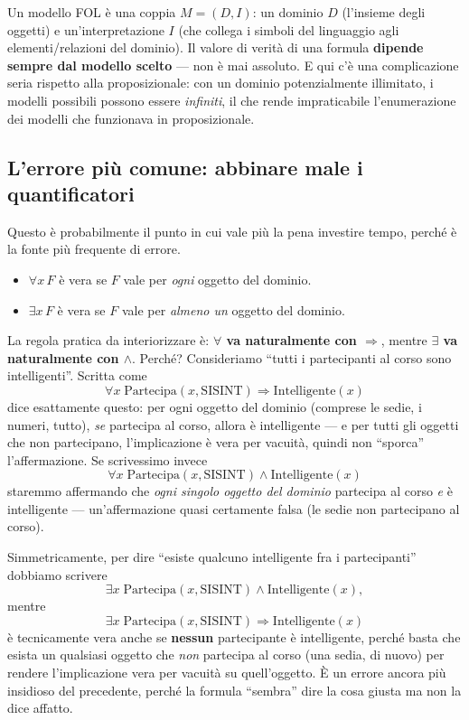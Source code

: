 \documentclass[11pt,a4paper]{article}
\begin{document}
Un modello FOL è una coppia $M=(D,I)$: un dominio $D$ (l'insieme degli oggetti) e un'interpretazione $I$ (che collega i simboli del linguaggio agli elementi/relazioni del dominio). Il valore di verità di una formula \textbf{dipende sempre dal modello scelto} --- non è mai assoluto. E qui c'è una complicazione seria rispetto alla proposizionale: con un dominio potenzialmente illimitato, i modelli possibili possono essere \emph{infiniti}, il che rende impraticabile l'enumerazione dei modelli che funzionava in proposizionale.

\subsection{L'errore più comune: abbinare male i quantificatori}

Questo è probabilmente il punto in cui vale più la pena investire tempo, perché è la fonte più frequente di errore.

\begin{itemize}
  \item $\forall x\, F$ è vera se $F$ vale per \emph{ogni} oggetto del dominio.
  \item $\exists x\, F$ è vera se $F$ vale per \emph{almeno un} oggetto del dominio.
\end{itemize}

La regola pratica da interiorizzare è: \textbf{$\forall$ va naturalmente con $\Rightarrow$}, mentre \textbf{$\exists$ va naturalmente con $\wedge$}. Perché? Consideriamo ``tutti i partecipanti al corso sono intelligenti''. Scritta come
\[
\forall x\; \text{Partecipa}(x,\text{SISINT}) \Rightarrow \text{Intelligente}(x)
\]
dice esattamente questo: per ogni oggetto del dominio (comprese le sedie, i numeri, tutto), \emph{se} partecipa al corso, allora è intelligente --- e per tutti gli oggetti che non partecipano, l'implicazione è vera per vacuità, quindi non ``sporca'' l'affermazione. Se scrivessimo invece
\[
\forall x\; \text{Partecipa}(x,\text{SISINT}) \wedge \text{Intelligente}(x)
\]
staremmo affermando che \emph{ogni singolo oggetto del dominio} partecipa al corso \emph{e} è intelligente --- un'affermazione quasi certamente falsa (le sedie non partecipano al corso).

Simmetricamente, per dire ``esiste qualcuno intelligente fra i partecipanti'' dobbiamo scrivere
\[
\exists x\; \text{Partecipa}(x,\text{SISINT}) \wedge \text{Intelligente}(x),
\]
mentre
\[
\exists x\; \text{Partecipa}(x,\text{SISINT}) \Rightarrow \text{Intelligente}(x)
\]
è tecnicamente vera anche se \textbf{nessun} partecipante è intelligente, perché basta che esista un qualsiasi oggetto che \emph{non} partecipa al corso (una sedia, di nuovo) per rendere l'implicazione vera per vacuità su quell'oggetto. È un errore ancora più insidioso del precedente, perché la formula ``sembra'' dire la cosa giusta ma non la dice affatto.
\end{document}
